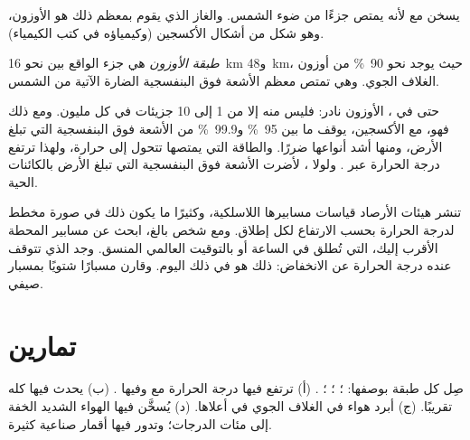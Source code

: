 يسخن  مع  لأنه يمتص جزءًا من ضوء الشمس. والغاز الذي
يقوم بمعظم ذلك هو الأوزون، وهو شكل من أشكال الأكسجين (وكيمياؤه في كتب
الكيمياء).

\begin{definition}\label{def:g8:the-atmosphere:ozone-layer}
\emph{طبقة الأوزون} هي جزء  الواقع بين
نحو \qty{16}{km} و\qty{48}{km}، حيث يوجد نحو 90~\% من أوزون الغلاف الجوي.
وهي تمتص معظم الأشعة فوق البنفسجية الضارة الآتية من الشمس.
\end{definition}

حتى في ، الأوزون نادر: فليس منه إلا من 1 إلى 10 جزيئات في كل
مليون. ومع ذلك فهو، مع الأكسجين، يوقف ما بين 95~\% و99.9~\% من الأشعة فوق
البنفسجية التي تبلغ الأرض، ومنها أشد أنواعها ضررًا. والطاقة التي يمتصها
تتحول إلى حرارة، ولهذا ترتفع درجة الحرارة عبر . ولولا ، لأضرت الأشعة فوق البنفسجية التي تبلغ الأرض بالكائنات الحية.

\begin{inthefield}
تنشر هيئات الأرصاد قياسات مسابيرها اللاسلكية، وكثيرًا ما يكون ذلك في صورة
مخطط لدرجة الحرارة بحسب الارتفاع لكل إطلاق. ومع شخص بالغ، ابحث عن
مسابير المحطة الأقرب إليك، التي تُطلق في الساعة  أو
 بالتوقيت العالمي المنسق. وجد  الذي تتوقف عنده
درجة الحرارة عن الانخفاض: ذلك هو  في ذلك اليوم. وقارن مسبارًا
شتويًا بمسبار صيفي.
\end{inthefield}

\section{تمارين}

\begin{exercise}[$\star$]\label{exo:g8:the-atmosphere:1}
صِل كل طبقة بوصفها: ؛ ؛ ؛ .
(أ) ترتفع فيها درجة الحرارة مع  وفيها . (ب) يحدث فيها
 كله تقريبًا. (ج) أبرد هواء في الغلاف الجوي في أعلاها. (د) يُسخَّن
فيها الهواء الشديد الخفة إلى مئات الدرجات؛ وتدور فيها أقمار صناعية كثيرة.
\end{exercise}

